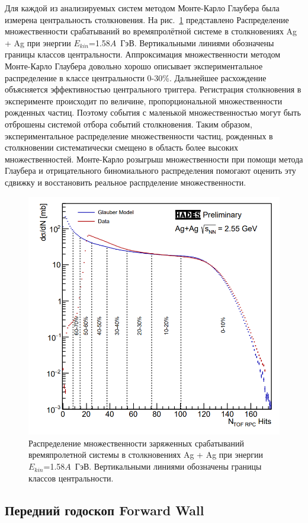 Для каждой из анализируемых систем методом Монте-Карло Глаубера была измерена центральность столкновения. 
На рис.~\ref{fig:hades_centrality} представлено Распределение множественности срабатываний во времяпролётной системе в столкновениях Ag + Ag при энергии $E_{kin}$=1.58$A$~ГэВ. Вертикальными линиями обозначены границы классов центральности.
Аппроксимация множественности методом Монте-Карло Глаубера довольно хорошо описывает экспериментальное распределение в классе центральности 0-30\%.
Дальнейшее расхождение объясняется эффективностью центрального триггера.
Регистрация столкновения в эксперименте происходит по величине, пропорциональной множественности рожденных частиц.
Поэтому события с маленькой множественностью могут быть отброшены системой отбора событий столкновения.
Таким образом, экспериментальное распределение множественности частиц, рожденных в столкновении систематически смещено в область более высоких множественностей.
Монте-Карло розыгрыш множественности при помощи метода Глаубера и отрицательного биномиального распределения помогают оценить эту сдвижку и восстановить реальное распрделение множественности.  
%
\begin{figure}[ht]
\begin{center}
\includegraphics[width=0.75\linewidth]{images/hades_mult.png}
\caption{Распределение множественности заряженных срабатываний времяпролетной системы в столкновениях Ag + Ag при энергии $E_{kin}$=1.58$A$~ГэВ. Вертикальными линиями обозначены границы классов центральности.}
\label{fig:hades_centrality}
\end{center}
\end{figure}

\subsection{Передний годоскоп Forward Wall}

